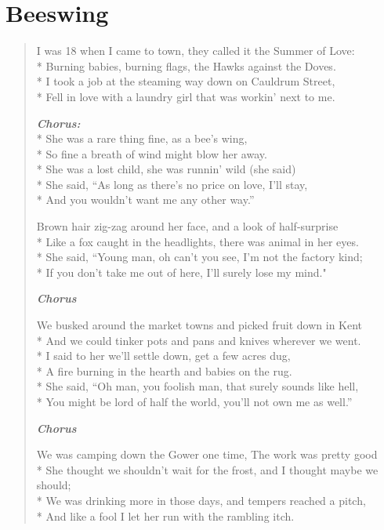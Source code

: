 \documentclass[9pt,twoside]{extarticle}
\newenvironment{xverse}{
	\begin{verse}
	\fontsize{8.5}{10.5}\selectfont
	}
	{
	\end{verse}
	\penalty 0
}
\newcommand{\chorusdef}{\textbf{\emph{Chorus:}}\\*}
\newcommand{\chorusmark}[1][1]{%
\vspace{-0.5\stanzaskip}%
\textbf{\emph{Chorus \ifthenelse{\equal{#1}{1}}{}{$\times$ #1}}}%
\vspace{-0.5\stanzaskip}%
}
\begin{document}
\section{Beeswing}
\begin{xverse}
I was 18 when I came to town, they called it the Summer of Love: \\*
Burning babies, burning flags, the Hawks against the Doves. \\*
I took a job at the steaming way down on Cauldrum Street, \\*
Fell in love with a laundry girl that was workin’ next to me.

\chorusdef
She was a rare thing fine, as a bee’s wing, \\*
So fine a breath of wind might blow her away. \\*
She was a lost child, she was runnin’ wild (she said) \\*
She said, “As long as there’s no price on love, I’ll stay, \\*
And you wouldn’t want me any other way.”

Brown hair zig-zag around her face, and a look of half-surprise \\*
Like a fox caught in the headlights, there was animal in her eyes. \\*
She said, “Young man, oh can’t you see, I’m not the factory kind; \\*
If you don’t take me out of here, I’ll surely lose my mind."

\chorusmark

We busked around the market towns and picked fruit down in Kent \\*
And we could tinker pots and pans and knives wherever we went. \\*
I said to her we’ll settle down, get a few acres dug, \\*
A fire burning in the hearth and babies on the rug. \\*
She said, “Oh man, you foolish man, that surely sounds like hell, \\*
You might be lord of half the world, you’ll not own me as well.”

\chorusmark

We was camping down the Gower one time, The work was pretty good \\*
She thought we shouldn’t wait for the frost, and I thought maybe we should; \\*
We was drinking more in those days, and tempers reached a pitch, \\*
And like a fool I let her run with the rambling itch.


\end{xverse}
\end{document}
